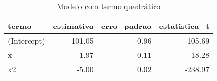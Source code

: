 \begin{table}

\caption{\label{tab:tabela2_exemplo4}Modelo com termo quadrático}
\centering
\begin{tabular}[t]{l|r|r|r}
\hline
termo & estimativa & erro\_padrao & estatistica\_t\\
\hline
(Intercept) & 101.05 & 0.96 & 105.69\\
\hline
x & 1.97 & 0.11 & 18.28\\
\hline
x2 & -5.00 & 0.02 & -238.97\\
\hline
\end{tabular}

\end{table}
